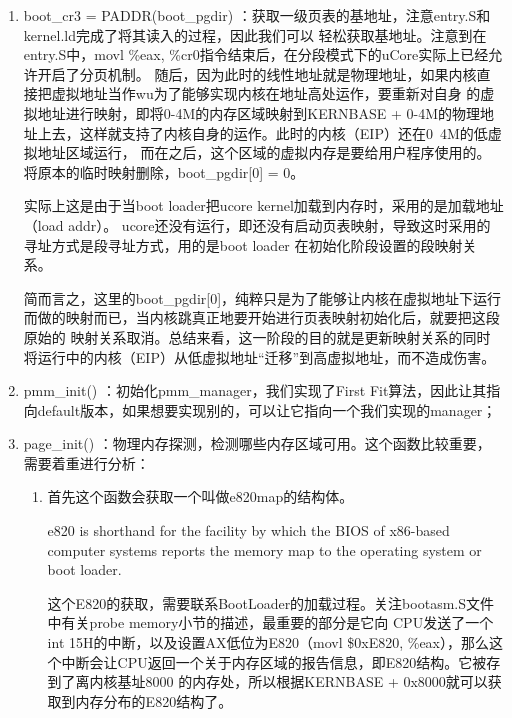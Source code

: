\documentclass[UTF8, a4paper]{ctexart}
\begin{document}
    \begin{enumerate}
        \item boot\_cr3 = PADDR(boot\_pgdir) ：获取一级页表的基地址，注意entry.S和kernel.ld完成了将其读入的过程，因此我们可以
              轻松获取基地址。注意到在entry.S中，movl \%eax, \%cr0指令结束后，在分段模式下的uCore实际上已经允许开启了分页机制。
              随后，因为此时的线性地址就是物理地址，如果内核直接把虚拟地址当作wu为了能够实现内核在地址高处运作，要重新对自身
              的虚拟地址进行映射，即将0-4M的内存区域映射到KERNBASE + 0-4M的物理地址上去，这样就支持了内核自身的运作。此时的内核（EIP）还在0~4M的低虚拟地址区域运行，
              而在之后，这个区域的虚拟内存是要给用户程序使用的。将原本的临时映射删除，boot\_pgdir[0] = 0。
              \par
              实际上这是由于当boot loader把ucore kernel加载到内存时，采用的是加载地址（load addr）。
              ucore还没有运行，即还没有启动页表映射，导致这时采用的寻址方式是段寻址方式，用的是boot loader
              在初始化阶段设置的段映射关系。
              \par
              简而言之，这里的boot\_pgdir[0]，纯粹只是为了能够让内核在虚拟地址下运行而做的映射而已，当内核跳真正地要开始进行页表映射初始化后，就要把这段原始的
              映射关系取消。总结来看，这一阶段的目的就是更新映射关系的同时将运行中的内核（EIP）从低虚拟地址“迁移”到高虚拟地址，而不造成伤害。
              
        \item pmm\_init() ：初始化pmm\_manager，我们实现了First Fit算法，因此让其指向default版本，如果想要实现别的，可以让它指向一个我们实现的manager；
        \item page\_init() ：物理内存探测，检测哪些内存区域可用。这个函数比较重要，需要着重进行分析：
            {
                \begin{enumerate}
                    \item 首先这个函数会获取一个叫做e820map的结构体。
                            \par
                            e820 is shorthand for the facility by which the BIOS of x86-based computer systems reports the memory map to the operating system or boot loader.
                            \par
                            这个E820的获取，需要联系BootLoader的加载过程。关注bootasm.S文件中有关probe memory小节的描述，最重要的部分是它向
                            CPU发送了一个int 15H的中断，以及设置AX低位为E820（movl \$0xE820, \%eax），那么这个中断会让CPU返回一个关于内存区域的报告信息，即E820结构。它被存到了离内核基址8000
                            的内存处，所以根据KERNBASE + 0x8000就可以获取到内存分布的E820结构了。
                \end{enumerate}
            }
    \end{enumerate} 
\end{document}
